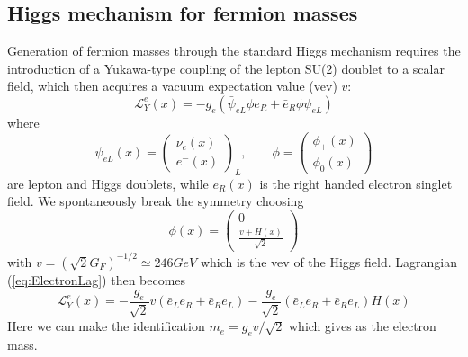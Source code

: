 \documentclass{subnucbo}
\begin{document}
\subsection{Higgs mechanism for fermion masses}
Generation of fermion masses through the standard Higgs mechanism requires the introduction of a Yukawa-type coupling of the lepton SU(2) doublet to a scalar field, which then acquires a vacuum expectation value (vev) $v$: 
\begin{equation}
\label{eq:ElectronLag}
\mathcal{L}_Y^e(x)=-g_e(\bar{\psi}_{eL}\phi e_R+\bar{e}_R\phi \psi_{eL}) 
\end{equation}
where
\begin{equation}
\psi_{eL}(x)=\begin{pmatrix}\nu_{e}(x)\\ e^-(x) \end{pmatrix}_L,\qquad
\phi=\begin{pmatrix}\phi_+(x)\\ \phi_0(x) \end{pmatrix}
\end{equation}
are lepton and Higgs doublets, while $e_R(x)$ is the right handed electron singlet field.
We spontaneously break the symmetry choosing 
\begin{equation}
\phi(x)=\begin{pmatrix}0\\ \frac{v+H(x)}{\sqrt{2}}\end{pmatrix}
\end{equation}
with $v=(\sqrt{2}G_F)^{-1/2}\simeq246GeV$ which is the vev of the Higgs field.
Lagrangian (\ref{eq:ElectronLag}) then becomes
\begin{equation}
\mathcal{L}_Y^e(x)=-\frac{g_e}{\sqrt{2}}v(\bar{e}_Le_R+\bar{e}_Re_L)-\frac{g_e}{\sqrt{2}}(\bar{e}_Le_R+\bar{e}_Re_L)H(x)
\end{equation}
Here we can make the identification $m_e=g_ev/\sqrt{2}$ which gives as the electron mass.
\end{document}
